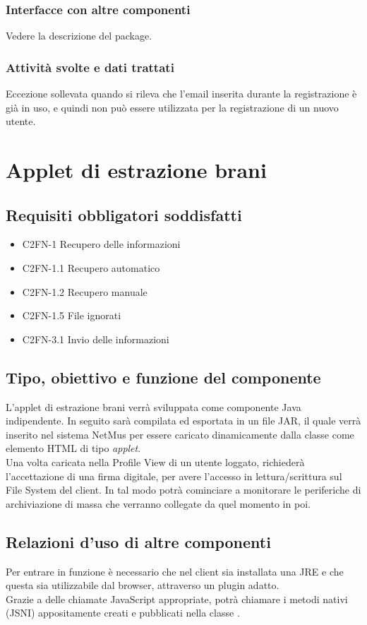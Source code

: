 \subsubsection*{Interfacce con altre componenti}
Vedere la descrizione del package.
\subsubsection*{Attivit\`a svolte e dati trattati}
Eccezione sollevata quando si rileva che l'email inserita durante la
registrazione \`e gi\`a in uso, e quindi non pu\`o essere utilizzata per la
registrazione di un nuovo utente.

\newpage
\section{Applet di estrazione brani}
\subsection*{Requisiti obbligatori soddisfatti}
\begin{itemize}
	\item C2FN-1 Recupero delle informazioni
	\item C2FN-1.1 Recupero automatico
	\item C2FN-1.2 Recupero manuale
	\item C2FN-1.5 File ignorati
	\item C2FN-3.1 Invio delle informazioni
\end{itemize}
\subsection*{Tipo, obiettivo e funzione del componente}
L'applet di estrazione brani verr\`a sviluppata come componente
Java indipendente. In seguito sar\`a compilata ed esportata in un file JAR, il
quale verr\`a inserito nel sistema NetMus per essere caricato dinamicamente
dalla classe  come elemento HTML di tipo \emph{applet}.\\
Una volta caricata nella Profile View di un utente loggato, richieder\`a
l'accettazione di una firma digitale, per avere l'accesso in lettura/scrittura
sul File System del client. In tal modo potr\`a cominciare a monitorare le
periferiche di archiviazione di massa che verranno collegate da quel momento in
poi.
 
\subsection*{Relazioni d'uso di altre componenti}
Per entrare in funzione \`e necessario che nel client sia installata una JRE e
che questa sia utilizzabile dal browser, attraverso un plugin adatto.\\
Grazie a delle chiamate JavaScript appropriate, potr\`a chiamare i metodi nativi
(JSNI) appositamente creati e pubblicati nella classe .

